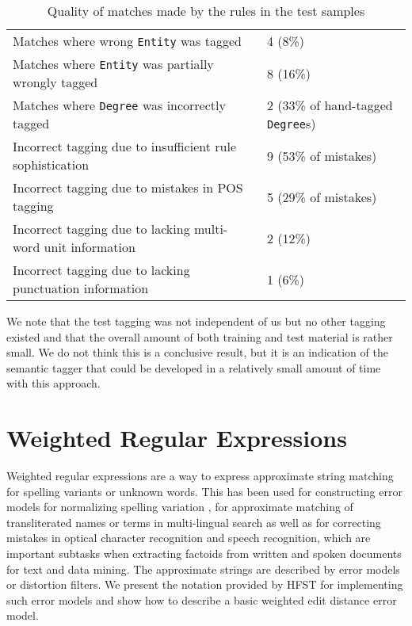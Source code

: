 \documentclass{llncs}
\begin{document}
\begin{table}[h]
  \centering
  \begin{tabular}{ l | l }
    \hline
    Matches where wrong \verb+Entity+ was tagged & 4 (8\%) \\
    Matches where \verb+Entity+ was partially wrongly tagged & 8 (16\%) \\
    Matches where \verb+Degree+ was incorrectly tagged & 2 (33\% of hand-tagged \verb+Degree+s) \\
    Incorrect tagging due to insufficient rule sophistication & 9 (53\% of mistakes) \\
    Incorrect tagging due to mistakes in POS tagging & 5 (29\% of mistakes) \\
    Incorrect tagging due to lacking multi-word unit information & 2 (12\%) \\
    Incorrect tagging due to lacking punctuation information & 1 (6\%) \\
    \hline
  \end{tabular}
  \caption{Quality of matches made by the rules in the test samples}
  \label{framequality}
\end{table}

We note that the test tagging was not independent of us but no other tagging existed and that
the overall amount of both training and test material is rather small. We do not think this is a conclusive result,
but it is an indication of the semantic tagger that could be developed in a relatively small amount of time with this approach.

\section{Weighted Regular Expressions}

Weighted regular expressions are a way to express approximate string matching for spelling variants or 
unknown words. This has been used for constructing error models for normalizing spelling variation \cite{pirinen2014}, 
for approximate matching of transliterated names or terms in multi-lingual search \cite{Linden06multilingualmodeling}
as well as for correcting mistakes in optical character recognition and speech recognition, which are important subtasks 
when extracting factoids from written and spoken documents
for text and data mining. The approximate strings are described by error models or distortion filters. 
We present the notation provided by HFST for implementing such error models and show how to describe 
a basic weighted edit distance error model.
\end{document}
